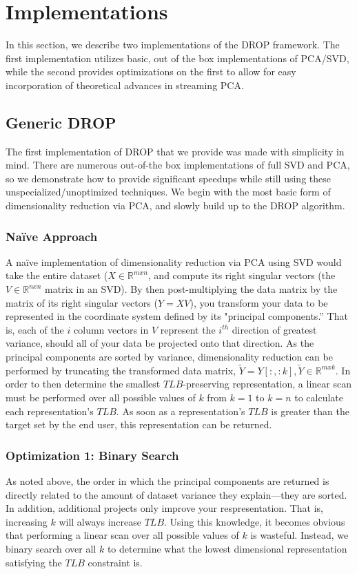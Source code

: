 \section{Implementations}
\label{sec:implementations}

In this section, we describe two implementations of the DROP framework. 
The first  implementation utilizes basic, out of the box implementations of PCA/SVD, while the second provides optimizations on the first to allow for easy incorporation of theoretical advances in streaming PCA.  

\subsection{Generic DROP}
The first implementation of DROP that we provide was made with simplicity in mind. There are numerous out-of-the box implementations of full SVD and PCA, so we demonstrate how to provide significant speedups while still using these unspecialized/unoptimized techniques. We begin with the most basic form of dimensionality reduction via PCA, and slowly build up to the DROP algorithm. 

\subsubsection{Na{\"i}ve Approach}
A na{\"i}ve implementation of dimensionality reduction via PCA using SVD would take the entire dataset ($X \in \mathbb{R}^{mxn}$, and compute its right singular vectors (the $V \in \mathbb{R}^{nxn}$ matrix in an SVD). 
By then post-multiplying the data matrix by the matrix of its right singular vectors ($Y = XV$), you transform your data to be represented in the coordinate system defined by its "principal components.'' 
That is, each of the $i$ column vectors in $V$ represent the $i^{th}$ direction of greatest variance, should all of your data be projected onto that direction. 
As the principal components are sorted by variance, dimensionality reduction can be performed by truncating the transformed data matrix, $\tilde{Y} = Y[:,:k], \tilde{Y} \in \mathbb{R}^{mxk}$. In order to then determine the smallest $TLB$-preserving representation, a linear scan must be performed over all possible values of $k$ from $k=1$ to $k=n$ to calculate each representation's $TLB$. 
As soon as a representation's $TLB$ is greater than the target set by the end user, this representation can be returned. 

\subsubsection{Optimization 1: Binary Search}
As noted above, the order in which the principal components are returned is directly related to the amount of dataset variance they explain---they are sorted. 
In addition, additional projects only improve your respresentation. 
That is, increasing $k$ will always increase $TLB$. 
Using this knowledge, it becomes obvious that performing a linear scan over all possible values of $k$ is wasteful. 
Instead, we binary search over all $k$ to determine what the lowest dimensional representation satisfying the $TLB$ constraint is. 

